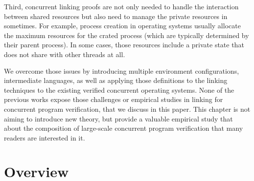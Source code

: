 Third, 
concurrent linking proofs are not only needed to handle the interaction between shared resources but also need to manage the private resources in sometimes. 
For example, process creation in operating systems usually allocate the maximum resources 
for the crated process (which are typically determined by their parent process).
In some cases, those resources include a private state that does not share with other threads at all. 


We overcome those issues by introducing multiple environment configurations, intermediate languages, 
as well as applying those definitions to the linking techniques to the existing verified concurrent operating systems. 
None of the previous works expose those challenges or empirical studies in linking for concurrent program verification,
that we discuss in this paper.
This chapter is not aiming to introduce new theory, 
but provide a valuable empirical study that 
about the composition of large-scale concurrent program verification that many readers are interested in it.


\section{Overview}
\label{chapter:conlink:sec:overview}



